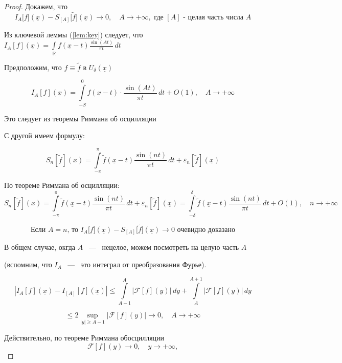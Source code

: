 \begin{proof}

Докажем, что 
\[
I_A \bigl[f\bigr](\underline{x}) - S_{[A]}\bigl[\widetilde{f}\bigr](\underline{x}) \longrightarrow 0, \quad A \to +\infty, \text{ где $[A]$ - целая часть числа $A$}
\]

Из ключевой леммы (\ref{lem:key}) следует, что $I_A[f](\underline{x}) = \int\limits_{\mathbb{R}} f(\underline{x} - t) \frac{\sin(At)}{\pi t} \, dt$

Предположим, что $f \equiv \widetilde{f}  
    \text{ в } U_\delta(\underline{x})$ 

\[
I_A \left[ f \right](\underline{x}) = \int\limits_{-S}^{0} f(\underline{x} - t) \cdot \frac{\sin(At)}{\pi t} \, dt + O(1), \quad A \to +\infty
\]

Это следует из теоремы Риммана об осцилляции %


С другой имеем формулу: %


\[
S_n \left[\widetilde{f}\right](x) = \int\limits_{-\pi}^{\pi} \widetilde{f}(\underline{x} - t) \frac{\sin(nt)}{\pi t} \, dt + \varepsilon_n \left[\widetilde{f}\right](\underline{x})
\]

По теореме Риммана об осцилляции: %
\[
S_n \left[\widetilde{f}\right](x) = \int\limits_{-\pi}^{\pi} \widetilde{f}(\underline{x} - t) \frac{\sin(nt)}{\pi t} \, dt + \varepsilon_n \left[\widetilde{f}\right](\underline{x}) = \int\limits_{-\delta}^{\delta} \widetilde{f}(\underline{x} - t) \frac{\sin(nt)}{\pi t} \, dt + O(1), \quad n \rightarrow +\infty
\]


\[
\text{Если $A = n$, то }I_A \bigl[f\bigr](\underline{x}) - S_{[A]}\bigl[\widetilde{f}\bigr](\underline{x}) \longrightarrow 0 \text{ 
очевидно доказано}
\]

В общем случае, окгда $A$ ~---~ нецелое, можем посмотреть на целую часть $A$

(вспомним, что $I_A$ ~---~ это интеграл от преобразования Фурье).

\[
\left| I_A \left[ f \right] (\underline{x}) - I_{[A]} \left[ f \right] (\underline{x}) \right| 
\leq 
\int\limits_{A-1}^{A} \left| \mathcal{F} [f](y) \right| \, dy + 
\int\limits_{A}^{A+1} \left| \mathcal{F} [f](y) \right| \, dy
\]

\[
\leq 2 \sup_{|y| \geq A-1} \left| \mathcal{F} [f](y) \right| \longrightarrow 0, \quad A \rightarrow +\infty
\]

Действительно, по теореме Риммана обосцилляции 
\[
\mathcal{F} \left[ f \right](y) \longrightarrow 0, \quad y \rightarrow +\infty,
\]


\end{proof}
